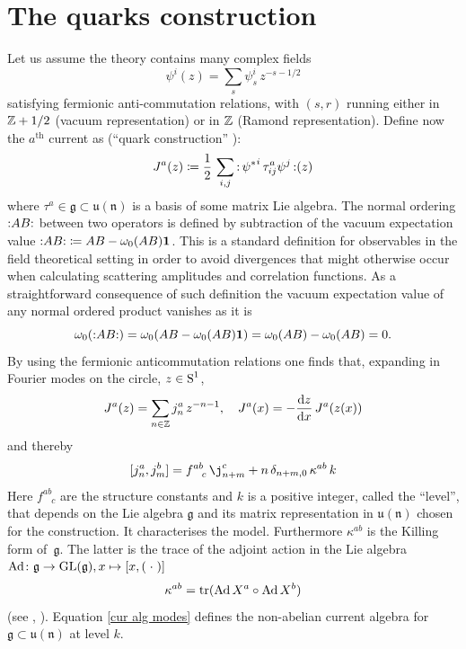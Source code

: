 \section{The quarks construction}
\label{The quarks construction}
Let us assume the theory contains many complex fields 
\[
\psi^i(z)=\sum_{s}\psi_s^i\,z^{-s-1/2}
\]
satisfying fermionic anti-commutation relations,
with $(s,r)$ running either in $\mathbb{Z}+1/2$ (vacuum representation) or in
$\mathbb{Z}$ (Ramond representation). Define now the $a^{\textrm{th}}$ current as
(``quark construction'' \cite*{KE:1998}):
\begin{equation}
\label{current}
J^a(z)\coloneqq \frac{1}{2}\,
\sum_{i,j}\,\wick{\,{\psi^*}^i\,\tau^a_{ij}\psi^j\,}(z) 
\end{equation}
where ${\tau}^a\in\mathfrak{g}\subset\mathfrak{u(n)}$ 
is a basis of some matrix Lie algebra. 
The normal ordering $\wick{AB}$ between two operators
is defined by subtraction of the vacuum
expectation value $\wick{AB}\coloneqq AB -\vac(AB)\bm{1}$.
This is a standard definition for observables
in the field theoretical setting in order to avoid
divergences that might otherwise occur when calculating
scattering amplitudes and correlation functions.
As a straightforward consequence of such definition 
the vacuum expectation value of any normal
ordered product vanishes as it is
\[
\vac(\wick{AB})=\vac(AB-\vac(AB)\bm{1})=\vac(AB)
-\vac(AB)=0.
\]
By using the fermionic anticommutation relations one finds that,
expanding in Fourier modes on the circle, $z\in\textrm{S}^1$,
\[
J^a(z)=\sum_{n\in\mathbb{Z}} j^a_n\,z^{-n-1},\quad
J^a(x)=-\frac{\textrm{d} z}{\textrm{d} x}\,J^a(z(x))
\]
and thereby
\begin{equation}
\comm{j^a_n,j^b_m}=f^{ab}_{\phantom{ab}c}\,\j^c_{n+m}
   +n\,\delta_{n+m,0}\,\kappa^{ab}\,k   \label{cur alg modes} 
\end{equation}
Here $f^{ab}_{\phantom{ab}c}$ are the structure constants 
and $k$ is a positive integer, called the ``level'',
that depends on the Lie algebra $\mathfrak{g}$ and
its matrix representation in $\mathfrak{u(n)}$ chosen
for the construction. It characterises the model. 
Furthermore $\kappa^{ab}$ is the Killing form of~$\mathfrak{g}$. 
The latter is the trace of the adjoint
action in the Lie algebra $\operatorname{Ad}\colon\mathfrak{g}
\to \textrm{GL}(\mathfrak{g}), x\mapsto[x,(\;{\cdot}\;)]$
\[
\kappa^{ab} = \operatorname{tr}(\operatorname{Ad} X^a\circ \operatorname{Ad} X^b) 
\]
(see \cite{RehrenERLCFT}, \cite{Fuchs:1992}).
Equation \eqref{cur alg modes} 
defines the non-abelian
current algebra for $\mathfrak{g}\subset \mathfrak{u(n)}$
at level $k$.

